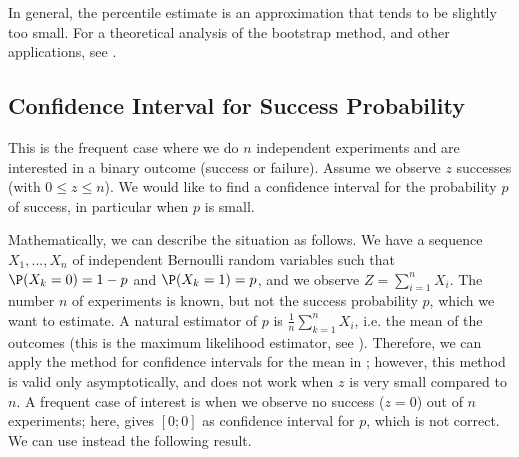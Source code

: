 In general, the percentile estimate is an approximation that
tends to be slightly too small. For a theoretical analysis of
the bootstrap method, and other applications, see
\cite{davison1997bootstrap}.


\subsection{Confidence Interval for Success Probability}
This is the frequent case where we do $n$ independent
experiments and are interested in a binary outcome (success or
failure). Assume we observe $z$ successes (with $0\leq z \leq
n$). We would like to find a confidence interval for the
probability $p$ of success, in particular when $p$ is small.

Mathematically, we can describe the situation as follows. We
have a sequence $X_1, ..., X_n$ of independent Bernoulli random
variables such that $\P(X_k= 0)=1-p$ and $\P(X_k= 1)=p$, and we
observe $Z=\sum_{i=1}^n X_i$. The number $n$ of experiments is
known, but not the success probability $p$, which we want to
estimate. A natural estimator of $p$ is
$\frac{1}{n}\sum_{k=1}^n X_i$, i.e. the mean of the outcomes
(this is the maximum likelihood estimator, see
). Therefore, we can apply the method for
confidence intervals for the mean in ;
however, this method is valid only asymptotically, and does not
work when $z$ is very small compared to $n$. A frequent case of
interest is when we observe no success ($z= 0$) out of $n$
experiments; here,  gives $[0;0]$ as
confidence interval for $p$, which is not correct. We can use
instead the following result.

